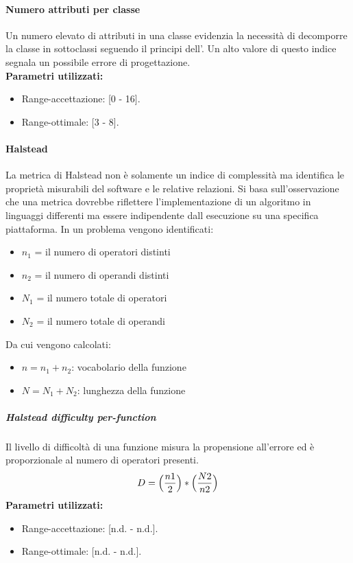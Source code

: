 			\paragraph{Numero attributi per classe}
			Un numero elevato di attributi in una classe evidenzia la necessità di decomporre la classe in sottoclassi seguendo il principi dell'. Un alto valore di questo indice segnala un possibile errore di progettazione.\\
			\textbf{Parametri utilizzati:}
			\begin{itemize}
				\item Range-accettazione: [0 - 16].
				\item Range-ottimale: [3 - 8].
			\end{itemize}
			
			\paragraph{Halstead}
			La metrica di Halstead non è solamente un indice di complessità ma identifica le proprietà misurabili del software e le relative relazioni.
			Si basa sull'osservazione che una metrica dovrebbe riflettere l'implementazione di un algoritmo in linguaggi differenti ma essere indipendente dall esecuzione su una specifica piattaforma.
			In un problema vengono identificati:
			\begin{itemize}
				\item $n_1$ = il numero di operatori distinti
				\item $n_2$ = il numero di operandi distinti
				\item $N_1$ = il numero totale di operatori
				\item $N_2$ = il numero totale di operandi
			\end{itemize}
			Da cui vengono calcolati:
				\begin{itemize}
				\item $n = n_1 + n_2$: vocabolario della funzione
				\item $N = N_1 + N_2$: lunghezza della funzione
			\end{itemize}
			
			\subparagraph{Halstead difficulty per-function}
			Il livello di difficoltà di una funzione misura la propensione all'errore ed è proporzionale al numero di operatori presenti. 
			\[
			 D = \Bigl( \dfrac{n1}{2} \Bigr)  * \Bigl(  \dfrac{N2}{n2} \Bigr)
			 \]
			 \textbf{Parametri utilizzati:}
			\begin{itemize}
				\item Range-accettazione: [n.d. - n.d.].
				\item Range-ottimale: [n.d. - n.d.].
			\end{itemize}
			
